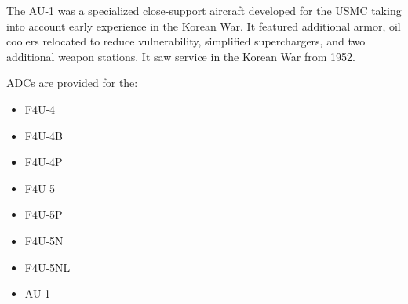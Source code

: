 The AU-1 was a specialized close-support aircraft developed for the USMC taking into account early experience in the Korean War. It featured additional armor, oil coolers relocated to reduce vulnerability, simplified superchargers, and two additional weapon stations. It saw service in the Korean War from 1952.

ADCs are provided for the:
\begin{itemize}
\item F4U-4
\item F4U-4B
\item F4U-4P
\item F4U-5
\item F4U-5P
\item F4U-5N
\item F4U-5NL
\item AU-1
\end{itemize}
